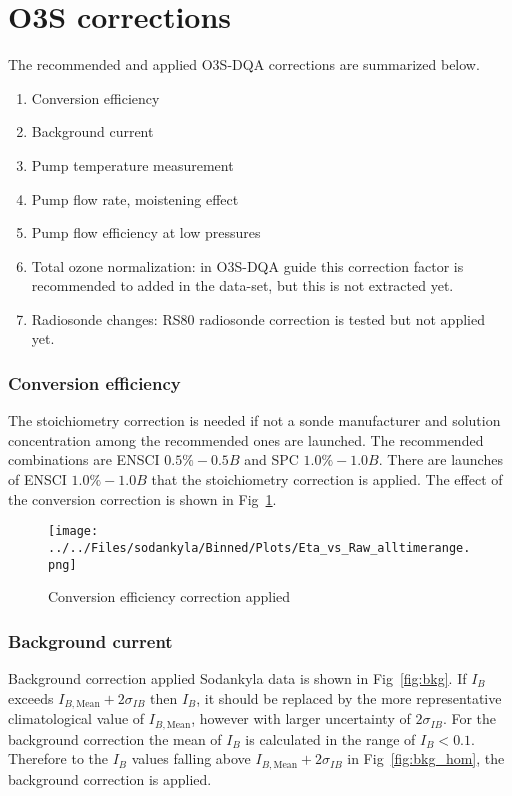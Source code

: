 \section{O3S corrections}
\label{sec:v04}


The recommended and applied O3S-DQA corrections are summarized below.
    \begin{enumerate}
        \item Conversion efficiency
        \item Background current
        \item Pump temperature measurement
        \item Pump flow rate, moistening effect
        \item Pump flow efficiency at low pressures
        \item Total ozone normalization: in O3S-DQA guide this correction factor is recommended to added in the data-set,
        but this is not extracted yet.
        \item Radiosonde changes: RS80 radiosonde correction is tested but not applied yet.
\end{enumerate}

    \subsubsection{Conversion efficiency}
 The stoichiometry correction is needed if not a sonde manufacturer and solution concentration among the recommended ones are launched. The recommended combinations are
    ENSCI $0.5\%-0.5B$ and SPC $1.0\%-1.0B$. There are launches of ENSCI $1.0\%-1.0B$ that the stoichiometry
    correction is applied. The effect of the conversion correction is shown in Fig~\ref{fig:eta}.

            \begin{figure}
        \centering
\texttt{[image: ../../Files/sodankyla/Binned/Plots/Eta\_vs\_Raw\_alltimerange.png]}
    \caption{Conversion efficiency correction applied}
            \label{fig:eta}
    \end{figure}

        \subsubsection{Background current}
        Background correction applied Sodankyla data is shown in Fig~\ref{fig:bkg}. If $I_B$ exceeds $I_{B,\text{Mean}}+2\sigma_{IB}$ then $I_B$, it
should be replaced by the more representative climatological value of $I_{B,\text{Mean}}$, however with
larger uncertainty of $2\sigma_{IB}$. For the background correction the mean of $I_B$ is calculated in the range of $I_B < 0.1$.
Therefore to the $I_B$ values falling above $I_{B,\text{Mean}}+2\sigma_{IB}$ in Fig~\ref{fig:bkg_hom}, the background correction is applied.

